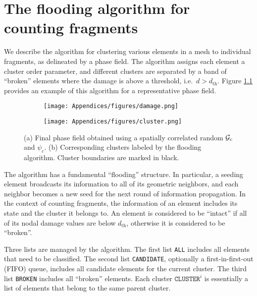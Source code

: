 \chapter{The flooding algorithm for counting fragments}
\label{appendix: flooding}

We describe the algorithm for clustering various elements in a mesh to individual fragments, as delineated by a phase field.
The algorithm assigns each element a cluster order parameter, and different clusters are separated by a band of ``broken'' elements where the damage is above a threshold, i.e.\ $d > d_{\text{th}}$. Figure \ref{fig: clustering} provides an example of this algorithm for a representative phase field.

\begin{figure}[htb!]
  \centering
  \begin{subfigure}[b]{0.375\textwidth}
    \texttt{[image: Appendices/figures/damage.png]}
    \caption{}
  \end{subfigure}
  \begin{subfigure}[b]{0.36\textwidth}
    \texttt{[image: Appendices/figures/cluster.png]}
    \vspace{-0.06in}
    \caption{}
  \end{subfigure}
  \caption[A phase field and its corresponding clusters labeled by the flooding algorithm.]{ (a) Final phase field obtained using a spatially correlated random ${\mathcal{G}_c}$ and $\psi_c$. (b) Corresponding clusters labeled by the flooding algorithm. Cluster boundaries are marked in black. }
  \label{fig: clustering}
\end{figure}

The algorithm has a fundamental ``flooding'' structure.  In particular, a seeding element broadcasts its information to all of its geometric neighbors, and each neighbor becomes a new seed for the next round of information propagation. In the context of counting fragments, the information of an element includes its state and the cluster it belongs to. An element is considered to be ``intact'' if all of its nodal damage values are below $d_{\text{th}}$, otherwise it is considered to be ``broken''.

Three lists are managed by the algorithm. The first list \texttt{ALL} includes all elements that need to be classified. The second list \texttt{CANDIDATE}, optionally a first-in-first-out (FIFO) queue, includes all candidate elements for the current cluster. The third list \texttt{BROKEN} includes all ``broken'' elements. Each cluster $\texttt{CLUSTER}^i$ is essentially a list of elements that belong to the same parent cluster.

